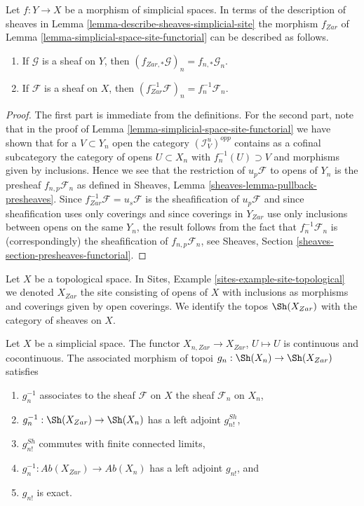 \begin{lemma}
\label{lemma-describe-functoriality}
Let $f : Y \to X$ be a morphism of simplicial spaces. In terms of the
description of sheaves in
Lemma \ref{lemma-describe-sheaves-simplicial-site} the
morphism $f_{Zar}$ of Lemma \ref{lemma-simplicial-space-site-functorial}
can be described as follows.
\begin{enumerate}
\item If $\mathcal{G}$ is a sheaf on $Y$, then
$(f_{Zar, *}\mathcal{G})_n = f_{n, *}\mathcal{G}_n$.
\item If $\mathcal{F}$ is a sheaf on $X$, then
$(f_{Zar}^{-1}\mathcal{F})_n = f_n^{-1}\mathcal{F}_n$.
\end{enumerate}
\end{lemma}

\begin{proof}
The first part is immediate from the definitions. For the second part, note
that in the proof of
Lemma \ref{lemma-simplicial-space-site-functorial}
we have shown that for a $V \subset Y_n$ open the category
$(\mathcal{I}_V^u)^{opp}$ contains as a cofinal subcategory
the category of opens $U \subset X_n$ with $f_n^{-1}(U) \supset V$
and morphisms given by inclusions. Hence we see that the restriction
of $u_p\mathcal{F}$ to opens of $Y_n$ is the presheaf
$f_{n, p}\mathcal{F}_n$ as defined in
Sheaves, Lemma \ref{sheaves-lemma-pullback-presheaves}.
Since $f_{Zar}^{-1}\mathcal{F} = u_s\mathcal{F}$ is the sheafification
of $u_p\mathcal{F}$ and since sheafification uses only coverings and
since coverings in $Y_{Zar}$ use only inclusions between opens on the
same $Y_n$, the result follows from the fact that $f_n^{-1}\mathcal{F}_n$
is (correspondingly) the sheafification of $f_{n, p}\mathcal{F}_n$, see
Sheaves, Section \ref{sheaves-section-presheaves-functorial}.
\end{proof}

\noindent
Let $X$ be a topological space. In
Sites, Example \ref{sites-example-site-topological}
we denoted $X_{Zar}$ the site consisting of opens of $X$
with inclusions as morphisms and coverings given by open coverings.
We identify the topos $\Sh(X_{Zar})$ with the category
of sheaves on $X$.

\begin{lemma}
\label{lemma-restriction-to-components}
Let $X$ be a simplicial space. The functor
$X_{n, Zar} \to X_{Zar}$, $U \mapsto U$ is continuous
and cocontinuous. The associated morphism of
topoi $g_n : \Sh(X_n) \to \Sh(X_{Zar})$ satisfies
\begin{enumerate}
\item $g_n^{-1}$ associates to the sheaf $\mathcal{F}$ on $X$
the sheaf $\mathcal{F}_n$ on $X_n$,
\item $g_n^{-1} : \Sh(X_{Zar}) \to \Sh(X_n)$ has a left adjoint $g^{Sh}_{n!}$,
\item $g^{Sh}_{n!}$ commutes with finite connected limits,
\item $g_n^{-1} : \textit{Ab}(X_{Zar}) \to \textit{Ab}(X_n)$
has a left adjoint $g_{n!}$, and
\item $g_{n!}$ is exact.
\end{enumerate}
\end{lemma}

